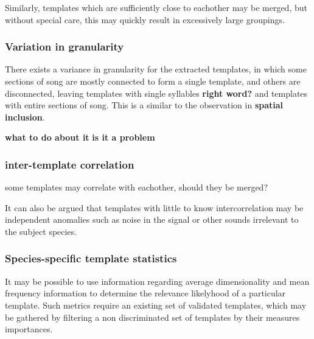 Similarly, templates which are sufficiently close to eachother may be merged,
but without special care, this may quickly result in excessively large groupings.

\subsubsection{Variation in granularity}
There exists a variance in granularity for the extracted templates, in which
some sections of song are mostly connected to form a single template, and others
are disconnected, leaving templates with single syllables \textbf{right word?}
and templates with entire sections of song.
This is a similar to the observation in \textbf{spatial inclusion}.

\textbf{what to do about it}
\textbf{is it a problem}


\subsubsection{inter-template correlation}
some templates may correlate with eachother, should they be merged?

It can also be argued that templates with little to know intercorrelation may be
independent anomalies such as noise in the signal or other sounds irrelevant to
the subject species.

\subsubsection{Species-specific template statistics}
It may be possible to use information regarding average dimensionality and mean
frequency information to determine the relevance likelyhood of a particular template.
Such metrics require an existing set of validated templates, which may be gathered
by filtering a non discriminated set of templates by their measures importances.

